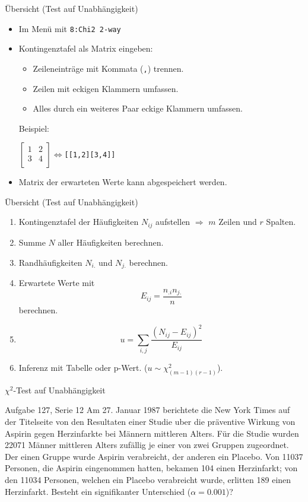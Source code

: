 \documentclass{beamer}
\newlength{\tikey}
\newcommand{\keystroke}[1]{\settowidth{\tikey}{\scriptsize #1}\psframebox[framearc=0.2]{\parbox{\tikey}{\scriptsize #1}}}
\begin{document}
\begin{frame}{Übersicht (Test auf Unabhängigkeit)}
\begin{itemize}
\item Im Menü \keystroke{F6} mit \texttt{8:Chi2 2-way}
\item Kontingenztafel als Matrix eingeben:
\begin{itemize}
\item Zeileneinträge mit Kommata (\texttt{,}) trennen.
\item Zeilen mit eckigen Klammern umfassen.
\item Alles durch ein weiteres Paar eckige Klammern umfassen.
\end{itemize}
Beispiel:

\begin{center}
$\begin{bmatrix}1 & 2\\ 3 & 4\\\end{bmatrix}\Leftrightarrow$\texttt{[[1,2][3,4]]} 
\end{center}

\item Matrix der erwarteten Werte kann abgespeichert werden.
\end{itemize}
\end{frame}

\begin{frame}{Übersicht (Test auf Unabhängigkeit)}
\begin{enumerate}
\item Kontingenztafel der Häufigkeiten $N_{ij}$ aufstellen $\Rightarrow$ $m$ Zeilen und $r$ Spalten.
\item Summe $N$ aller Häufigkeiten berechnen.
\item Randhäufigkeiten $N_{i.}$ und $N_{j.}$ berechnen.
\item Erwartete Werte mit
$$
E_{ij}=\frac{n_{.i}n_{j.}}{n}
$$
berechnen.
\item
$$
u=\sum_{i,j}\frac{(N_{ij}-E_{ij})^2}{E_{ij}}
$$
\item Inferenz mit Tabelle oder p-Wert. ($u\sim \chi^2_{(m-1)(r-1)}$).
\end{enumerate}
\end{frame}

\begin{frame}{$\chi^2$-Test auf Unabhängigkeit}
\begin{beamerboxesrounded}[shadow]{Aufgabe 127, Serie 12}
Am 27. Januar 1987 berichtete die New York Times auf der Titelseite von den Resultaten
einer Studie uber die präventive Wirkung von Aspirin gegen Herzinfarkte bei Männern
mittleren Alters. Für die Studie wurden 22071 Männer mittleren Alters zufällig je einer
von zwei Gruppen zugeordnet. Der einen Gruppe wurde Aspirin verabreicht, der anderen
ein Placebo. Von 11037 Personen, die Aspirin eingenommen hatten, bekamen 104 einen
Herzinfarkt; von den 11034 Personen, welchen ein Placebo verabreicht wurde, erlitten 189
einen Herzinfarkt. Besteht ein signifikanter Unterschied ($\alpha = 0.001$)?
\end{beamerboxesrounded}
\end{frame}
\end{document}
